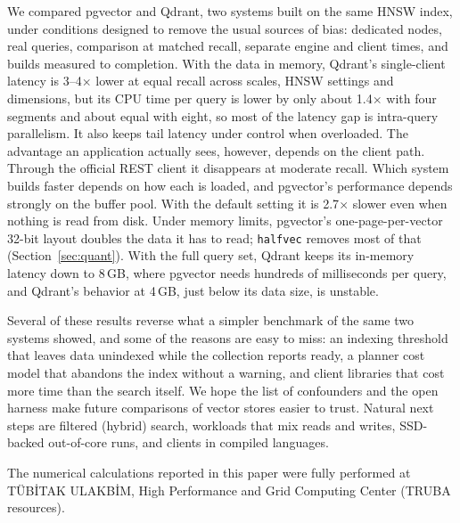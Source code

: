 \documentclass[sigconf, nonacm]{acmart}
\begin{document}
We compared pgvector and Qdrant, two systems built on the same HNSW index, under
conditions designed to remove the usual sources of bias: dedicated nodes, real queries,
comparison at matched recall, separate engine and client times, and builds measured to
completion. With the data in memory, Qdrant's single-client latency is 3--4$\times$ lower at
equal recall across scales, HNSW settings and dimensions, but its CPU time per query is
lower by only about 1.4$\times$ with four segments and about equal with eight, so most
of the latency gap is intra-query parallelism. It also keeps tail latency under control
when overloaded. The advantage an application actually sees, however, depends on
the client path. Through the official REST client it disappears at moderate recall.
Which system builds faster depends on how each is loaded, and pgvector's performance
depends strongly on the buffer pool. With the default setting it is
2.7$\times$ slower even when nothing is read from disk. Under memory limits, pgvector's
one-page-per-vector 32-bit layout doubles the data it has to read; \texttt{halfvec} removes most of that (Section~\ref{sec:quant}). With the full query set, Qdrant keeps
its in-memory latency down to 8\,GB, where pgvector needs hundreds of milliseconds per query,
and Qdrant's behavior at 4\,GB, just below its data size, is unstable.

Several of these results reverse what a simpler benchmark of the same two systems
showed, and some of the reasons are easy to miss: an indexing threshold that leaves
data unindexed while the collection reports ready, a planner cost model that abandons
the index without a warning, and client libraries that cost more time than the search
itself. We hope the list of confounders and the open harness make future comparisons of
vector stores easier to trust. Natural next steps are filtered (hybrid) search,
workloads that mix reads and writes, SSD-backed out-of-core runs, and clients in compiled
languages.

\begin{acks}
The numerical calculations reported in this paper were fully performed at TÜBİTAK
ULAKBİM, High Performance and Grid Computing Center (TRUBA resources).
\end{acks}
\end{document}
